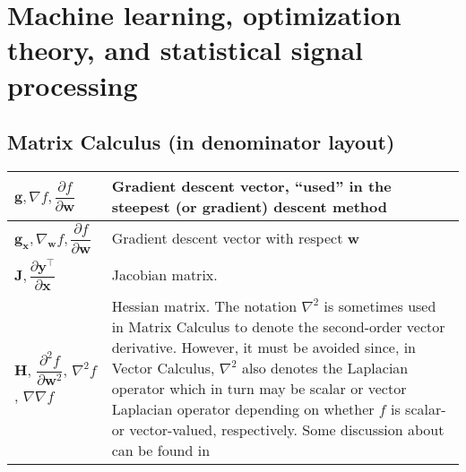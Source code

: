 \section{Machine learning, optimization theory, and \newline statistical signal processing}
\subsection{Matrix Calculus (in denominator layout)}
\begin{xltabular}{\textwidth}{XX}
	\(\mathbf{g}, \nabla f, \dfrac{\partial f}{\partial \mathbf{w}}\)                                                       & Gradient descent vector, ``used'' in the steepest (or gradient) descent method                                                                                                                                                                                                                                                                                                                                                             \\ \hline
	\(\mathbf{g}_{\mathbf{x}}, \nabla_{\mathbf{w}}f, \dfrac{\partial f}{\partial \mathbf{w}}\)                              & Gradient descent vector with respect \(\mathbf{w}\) \cite{bishopPatternRecognitionMachine2006}                                                                                                                                                                                                                                                                                                                                             \\ \hline
	\(\mathbf{J}, \dfrac{\partial \mathbf{y}^{\top}}{\partial \mathbf{x}}\)                                                 & Jacobian matrix.                                                                                                                                                                                                                                                                                                                                                                                                                           \\ \hline
	\(\mathbf{H}\), \(\dfrac{\partial^2 f}{\partial \mathbf{w}^2}\), \(\nabla^2 f\) \cite{haykinNeuralNetworksLearning2009}, \(\nabla\nabla f\) \cite{bishopPatternRecognitionMachine2006} & Hessian matrix. The notation \(\nabla^2\) is sometimes used in Matrix Calculus to denote the second-order vector derivative. However, it must be avoided since, in Vector Calculus, \(\nabla^2\) also denotes the Laplacian operator which in turn may be scalar or vector Laplacian operator depending on whether \(f\) is scalar- or vector-valued, respectively. Some discussion about can be found in \cite{4693212, 1353761, 4560326} \\ \hline
\end{xltabular}
